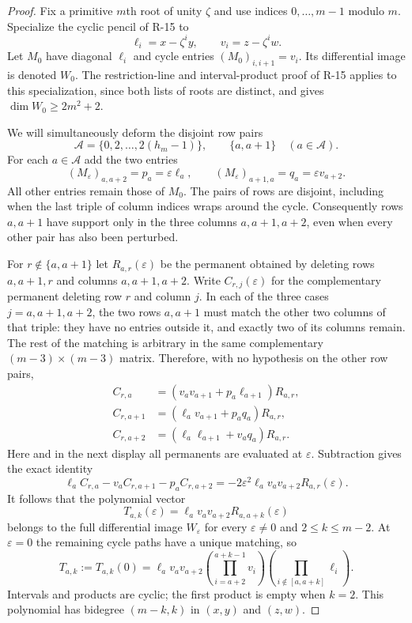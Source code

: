 \documentclass[11pt,a4paper]{article}
\theoremstyle{definition}\newtheorem{definition}{Definition}
\begin{document}
\begin{proof}
Fix a primitive $m$th root of unity $\zeta$ and use indices
$0,\ldots,m-1$ modulo $m$. Specialize the cyclic pencil of
R-15 to
\[
 \ell_i=x-\zeta^i y,\qquad v_i=z-\zeta^i w.
\]
Let $M_0$ have diagonal $\ell_i$ and cycle entries
$(M_0)_{i,i+1}=v_i$. Its differential image is denoted $W_0$.
The restriction-line and interval-product proof of R-15 applies
to this specialization, since both lists of roots are distinct,
and gives $\dim W_0\geq2m^2+2$.

We will simultaneously deform the disjoint row pairs
\[
 \mathcal A=\{0,2,\ldots,2(h_m-1)\},\qquad
 \{a,a+1\}\quad(a\in\mathcal A).
\]
For each $a\in\mathcal A$ add the two entries
\begin{equation}\label{R16:simultaneouspencil}
 (M_\varepsilon)_{a,a+2}=p_a=\varepsilon\ell_a,
 \qquad
 (M_\varepsilon)_{a+1,a}=q_a=\varepsilon v_{a+2}.
\end{equation}
All other entries remain those of $M_0$. The pairs of rows are
disjoint, including when the last triple of column indices
wraps around the cycle. Consequently rows $a,a+1$ have support
only in the three columns $a,a+1,a+2$, even when every other
pair has also been perturbed.

For $r\notin\{a,a+1\}$ let $R_{a,r}(\varepsilon)$ be the
permanent obtained by deleting rows $a,a+1,r$ and columns
$a,a+1,a+2$. Write $C_{r,j}(\varepsilon)$ for the complementary
permanent deleting row $r$ and column $j$. In each of the
three cases $j=a,a+1,a+2$, the two rows $a,a+1$ must match
the other two columns of that triple: they have no entries
outside it, and exactly two of its columns remain. The rest
of the matching is arbitrary in the same complementary
$(m-3)\times(m-3)$ matrix. Therefore, with no hypothesis on
the other row pairs,
\[
 \begin{aligned}
 C_{r,a}&=(v_a v_{a+1}+p_a\ell_{a+1})R_{a,r},\\
 C_{r,a+1}&=(\ell_a v_{a+1}+p_aq_a)R_{a,r},\\
 C_{r,a+2}&=(\ell_a\ell_{a+1}+v_aq_a)R_{a,r}.
 \end{aligned}
\]
Here and in the next display all permanents are evaluated at
$\varepsilon$. Subtraction gives the exact identity
\begin{equation}\label{R16:simultaneousidentity}
 \ell_a C_{r,a}-v_a C_{r,a+1}-p_a C_{r,a+2}
   =-2\varepsilon^2\ell_a v_a v_{a+2}R_{a,r}(\varepsilon).
\end{equation}
It follows that the polynomial vector
\[
 T_{a,k}(\varepsilon)
   =\ell_a v_a v_{a+2}R_{a,a+k}(\varepsilon)
\]
belongs to the full differential image $W_\varepsilon$ for
every $\varepsilon\ne0$ and $2\leq k\leq m-2$.
At $\varepsilon=0$ the remaining cycle paths have a unique
matching, so
\begin{equation}\label{R16:normalvectors}
 T_{a,k}:=T_{a,k}(0)
 =\ell_a v_a v_{a+2}
   \left(\prod_{i=a+2}^{a+k-1}v_i\right)
   \left(\prod_{i\notin[a,a+k]}\ell_i\right).
\end{equation}
Intervals and products are cyclic; the first product is empty
when $k=2$. This polynomial has bidegree $(m-k,k)$ in
$(x,y)$ and $(z,w)$.


\end{proof}
\end{document}
